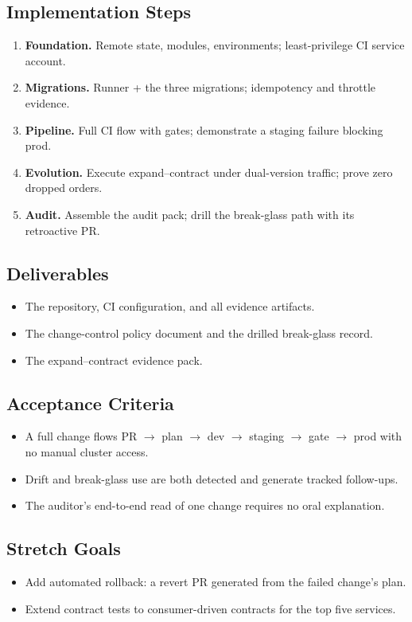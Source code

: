 \subsection*{Implementation Steps}
\begin{enumerate}
    \item \textbf{Foundation.} Remote state, modules, environments; least-privilege CI service account.
    \item \textbf{Migrations.} Runner + the three migrations; idempotency and throttle evidence.
    \item \textbf{Pipeline.} Full CI flow with gates; demonstrate a staging failure blocking prod.
    \item \textbf{Evolution.} Execute expand--contract under dual-version traffic; prove zero dropped orders.
    \item \textbf{Audit.} Assemble the audit pack; drill the break-glass path with its retroactive PR.
\end{enumerate}

\subsection*{Deliverables}
\begin{itemize}
    \item The repository, CI configuration, and all evidence artifacts.
    \item The change-control policy document and the drilled break-glass record.
    \item The expand--contract evidence pack.
\end{itemize}

\subsection*{Acceptance Criteria}
\begin{itemize}
    \item A full change flows PR $\to$ plan $\to$ dev $\to$ staging $\to$ gate $\to$ prod with no manual cluster access.
    \item Drift and break-glass use are both detected and generate tracked follow-ups.
    \item The auditor's end-to-end read of one change requires no oral explanation.
\end{itemize}

\subsection*{Stretch Goals}
\begin{itemize}
    \item Add automated rollback: a revert PR generated from the failed change's plan.
    \item Extend contract tests to consumer-driven contracts for the top five services.
\end{itemize}
